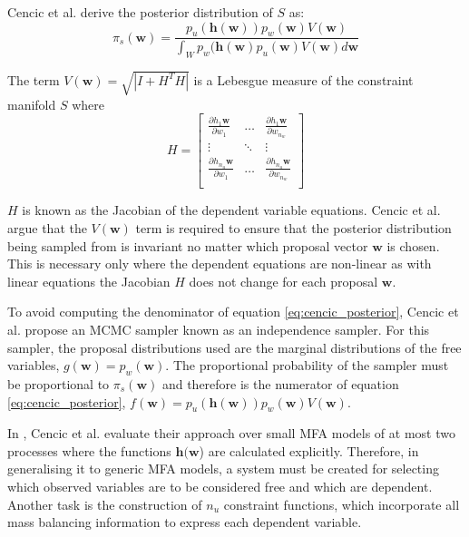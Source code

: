 \documentclass[ %
                    author={Tom Jager},
                supervisor={Dr. Daniel Schien},
                    degree={MEng},
                     title={A Bayesian Inference Engine for Calibrating Uncertainty over UMIS Structured MFA Systems},
                  subtitle={},
                      type={research},
                      year={2019} ]{dissertation}
\begin{document}
Cencic et al. derive the posterior distribution of $S$ as:
\begin{equation}
\label{eq:cencic_posterior}
    \pi_s(\bm{w}) = \frac{p_{u}(\bm{h}(\bm{w})) p_{w}(\bm{w}) V(\bm{w})}{\int_W p_{w}(\bm{h}(\bm{w}) p_{u}(\bm{w}) V(\bm{w}) d\bm{w}}
\end{equation}

The term $V(\bm{w}) = \sqrt{|I + H^TH|}$ is a Lebesgue measure of the constraint manifold $S$ where $$H = \begin{bmatrix}
    \frac{\partial h_1{\bm{w}}}{\partial w_1} & \dots & \frac{\partial h_1{\bm{w}}}{\partial w_{n_w}} \\ 
    \vdots & \ddots & \vdots \\
    \frac{\partial h_{n_u}{\bm{w}}}{\partial w_1} & \dots & \frac{\partial h_{n_u}{\bm{w}}}{\partial w_{n_w}} \\
\end{bmatrix}$$ 

$H$ is known as the Jacobian of the dependent variable equations. Cencic et al. argue that the $V(\bm{w})$ term is required to ensure that the posterior distribution being sampled from is invariant no matter which proposal vector $\bm{w}$ is chosen. This is necessary only where the dependent equations are non-linear as with linear equations the Jacobian $H$ does not change for each proposal $\bm{w}$.


To avoid computing the denominator of equation \ref{eq:cencic_posterior}, Cencic et al. propose an MCMC sampler known as an independence sampler. For this sampler, the proposal distributions used are the marginal distributions of the free variables, $g(\bm{w}) = p_w(\bm{w})$. The proportional probability of the sampler must be proportional to $\pi_s(\bm{w})$ and therefore is the numerator of equation \ref{eq:cencic_posterior}, $f(\bm{w}) = p_{u}(\bm{h}(\bm{w})) p_{w}(\bm{w}) V(\bm{w})$.

In \cite{cencic2018data}, Cencic et al. evaluate their approach over small MFA models of at most two processes where the functions $\bm{h}(\bm{w}$) are calculated explicitly. Therefore, in generalising it to generic MFA models, a system must be created for selecting which observed variables are to be considered free and which are dependent. Another task is the construction of $n_u$ constraint functions, which incorporate all mass balancing information to express each dependent variable.
\end{document}

